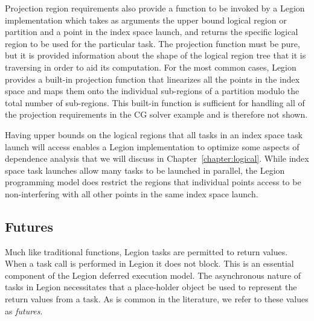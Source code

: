 Projection region 
requirements also provide a function to be 
invoked by a Legion implementation which takes 
as arguments the upper bound logical region 
or partition and a point in the index 
space launch, and returns the specific logical 
region to be used for the particular task. 
The projection function must be pure, but it 
is provided information about the shape of the logical
region tree that it is traversing in order to
aid its computation. For the most common cases,
Legion provides a built-in projection function 
that linearizes all the points in the index space 
and maps them onto the individual sub-regions of 
a partition modulo the total number of sub-regions.
This built-in function is sufficient for handling
all of the projection requirements in the CG
solver example and is therefore not shown.

Having upper bounds on the 
logical regions that all tasks in an index 
space task launch will access enables a Legion 
implementation to optimize some aspects of dependence 
analysis that we will discuss in 
Chapter~\ref{chapter:logical}.
While index space task launches allow
many tasks to be launched in parallel, 
the Legion programming model does restrict
the regions that individual points access
to be non-interfering with all other
points in the same index space launch.


\subsection{Futures}
\label{subsec:futures}
Much like traditional functions, Legion tasks
are permitted to return values. When a
task call is performed in Legion it does
not block. This is an essential component
of the Legion deferred execution model. The 
asynchronous nature of tasks in Legion necessitates 
that a place-holder object be used to represent the
return values from a task. As is common in the
literature, we refer to these values as {\em futures}.

